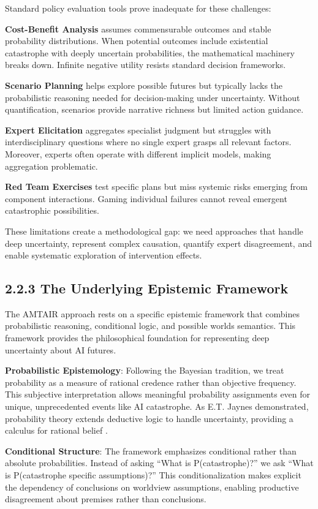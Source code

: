 \documentclass[
  11pt,
  letterpaper,
  openany]{book}
\begin{document}
Standard policy evaluation tools prove inadequate for these challenges:

\textbf{Cost-Benefit Analysis} assumes commensurable outcomes and stable
probability distributions. When potential outcomes include existential
catastrophe with deeply uncertain probabilities, the mathematical
machinery breaks down. Infinite negative utility resists standard
decision frameworks.

\textbf{Scenario Planning} helps explore possible futures but typically
lacks the probabilistic reasoning needed for decision-making under
uncertainty. Without quantification, scenarios provide narrative
richness but limited action guidance.

\textbf{Expert Elicitation} aggregates specialist judgment but struggles
with interdisciplinary questions where no single expert grasps all
relevant factors. Moreover, experts often operate with different
implicit models, making aggregation problematic.

\textbf{Red Team Exercises} test specific plans but miss systemic risks
emerging from component interactions. Gaming individual failures cannot
reveal emergent catastrophic possibilities.

These limitations create a methodological gap: we need approaches that
handle deep uncertainty, represent complex causation, quantify expert
disagreement, and enable systematic exploration of intervention effects.

\subsection{2.2.3 The Underlying Epistemic
Framework}\label{the-underlying-epistemic-framework}

The AMTAIR approach rests on a specific epistemic framework that
combines probabilistic reasoning, conditional logic, and possible worlds
semantics. This framework provides the philosophical foundation for
representing deep uncertainty about AI futures.

\textbf{Probabilistic Epistemology}: Following the Bayesian tradition,
we treat probability as a measure of rational credence rather than
objective frequency. This subjective interpretation allows meaningful
probability assignments even for unique, unprecedented events like AI
catastrophe. As E.T. Jaynes demonstrated, probability theory extends
deductive logic to handle uncertainty, providing a calculus for rational
belief \textcite{jaynes2003}.

\textbf{Conditional Structure}: The framework emphasizes conditional
rather than absolute probabilities. Instead of asking ``What is
P(catastrophe)?'' we ask ``What is P(catastrophe \textbar{} specific
assumptions)?'' This conditionalization makes explicit the dependency of
conclusions on worldview assumptions, enabling productive disagreement
about premises rather than conclusions.
\end{document}
